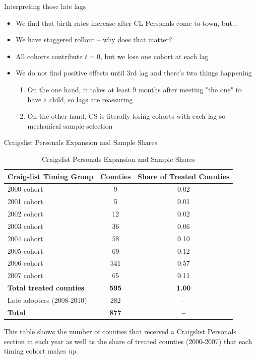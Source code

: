 \documentclass{beamer}
\begin{document}
\begin{frame}{Interpreting those late lags}

\begin{itemize}
\item We find that birth rates increase after CL Personals come to town, but...
\item We have staggered rollout -- why does that matter?
\item All cohorts contribute $t=0$, but we lose one cohort at each lag
\item We do not find positive effects until 3rd lag and there's two things happening
	\begin{enumerate}
	\item On the one hand, it takes at least 9 months after meeting "the one" to have a child, so lags are reassuring
	\item On the other hand, CS is literally losing cohorts with each lag so mechanical sample selection
	\end{enumerate}

\end{itemize}

\end{frame}


\begin{frame}[shrink=20]{Craigslist Personals Expansion and Sample Shares}
\begin{table}[htbp]\centering
\footnotesize
\caption{Craigslist Personals Expansion and Sample Shares}
\label{tab:table1}
\begin{threeparttable}
\begin{tabular}{lcc}
\toprule
\textbf{Craigslist Timing Group} & \textbf{Counties} & \textbf{Share of Treated Counties} \\
\midrule
2000 cohort & 9 & 0.02 \\
2001 cohort & 5 & 0.01 \\
2002 cohort & 12 & 0.02 \\
2003 cohort & 36 & 0.06 \\
2004 cohort & 58 & 0.10 \\
2005 cohort & 69 & 0.12 \\
2006 cohort & 341 & 0.57 \\
2007 cohort & 65 & 0.11 \\
\midrule
\textbf{Total treated counties} & \textbf{595} & \textbf{1.00} \\
\midrule
Late adopters (2008-2010) & 282 & -- \\
\midrule
\textbf{Total} & \textbf{877} & \textbf{--} \\
\bottomrule
\end{tabular}
\begin{tablenotes}
\footnotesize
\item This table shows the number of counties that received a Craigslist Personals section in each year as well as the share of treated counties (2000-2007) that each timing cohort makes up.
\end{tablenotes}
\end{threeparttable}
\end{table}
\end{frame}
\end{document}

